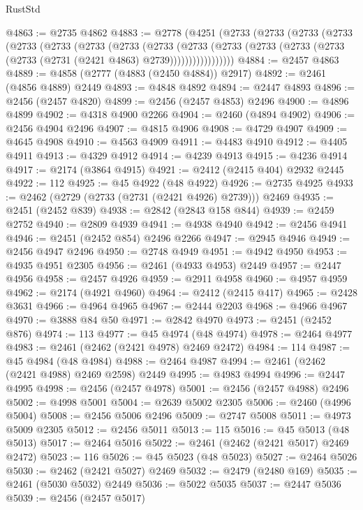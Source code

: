\begin{lexlean}{RustStd}
\begin{coremodule}
@4863 := @2735 @4862
@4883 := @2778
    (@4251
      (@2733
        (@2733
          (@2733
            (@2733
              (@2733
                (@2733
                  (@2733
                    (@2733
                      (@2733
                        (@2733
                          (@2733
                            (@2733 (@2733 (@2733 (@2733 (@2731 (@2421 @4863) @2739)))))))))))))))))
@4884 := @2457 @4863
@4889 := @4858 (@2777 (@4883 (@2450 @4884)) @2917)
@4892 := @2461 (@4856 @4889) @2449
@4893 := @4848 @4892
@4894 := @2447 @4893
@4896 := @2456 (@2457 @4820)
@4899 := @2456 (@2457 @4853) @2496
@4900 := @4896 @4899
@4902 := @4318 @4900 @2266
@4904 := @2460 (@4894 @4902)
@4906 := @2456 @4904 @2496
@4907 := @4815 @4906
@4908 := @4729 @4907
@4909 := @4645 @4908
@4910 := @4563 @4909
@4911 := @4483 @4910
@4912 := @4405 @4911
@4913 := @4329 @4912
@4914 := @4239 @4913
@4915 := @4236 @4914
@4917 := @2174 (@3864 @4915)
@4921 := @2412 (@2415 @404) @2932 @2445
@4922 := 112
@4925 := @45 @4922 (@48 @4922)
@4926 := @2735 @4925
@4933 := @2462 (@2729 (@2733 (@2731 (@2421 @4926) @2739))) @2469
@4935 := @2451 (@2452 @839)
@4938 := @2842 (@2843 @158 @844)
@4939 := @2459 @2752
@4940 := @2809 @4939
@4941 := @4938 @4940
@4942 := @2456 @4941
@4946 := @2451 (@2452 @854) @2496 @2266
@4947 := @2945 @4946
@4949 := @2456 @4947 @2496
@4950 := @2748 @4949
@4951 := @4942 @4950
@4953 := @4935 @4951 @2305
@4956 := @2461 (@4933 @4953) @2449
@4957 := @2447 @4956
@4958 := @2457 @4926
@4959 := @2911 @4958
@4960 := @4957 @4959
@4962 := @2174 (@4921 @4960)
@4964 := @2412 (@2415 @417)
@4965 := @2428 @3631
@4966 := @4964 @4965
@4967 := @2444 @2203
@4968 := @4966 @4967
@4970 := @3888 @84 @50
@4971 := @2842 @4970
@4973 := @2451 (@2452 @876)
@4974 := 113
@4977 := @45 @4974 (@48 @4974)
@4978 := @2464 @4977
@4983 := @2461 (@2462 (@2421 @4978) @2469 @2472)
@4984 := 114
@4987 := @45 @4984 (@48 @4984)
@4988 := @2464 @4987
@4994 := @2461 (@2462 (@2421 @4988) @2469 @2598) @2449
@4995 := @4983 @4994
@4996 := @2447 @4995
@4998 := @2456 (@2457 @4978)
@5001 := @2456 (@2457 @4988) @2496
@5002 := @4998 @5001
@5004 := @2639 @5002 @2305
@5006 := @2460 (@4996 @5004)
@5008 := @2456 @5006 @2496
@5009 := @2747 @5008
@5011 := @4973 @5009 @2305
@5012 := @2456 @5011
@5013 := 115
@5016 := @45 @5013 (@48 @5013)
@5017 := @2464 @5016
@5022 := @2461 (@2462 (@2421 @5017) @2469 @2472)
@5023 := 116
@5026 := @45 @5023 (@48 @5023)
@5027 := @2464 @5026
@5030 := @2462 (@2421 @5027) @2469
@5032 := @2479 (@2480 @169)
@5035 := @2461 (@5030 @5032) @2449
@5036 := @5022 @5035
@5037 := @2447 @5036
@5039 := @2456 (@2457 @5017)

\end{coremodule}
\end{lexlean}
